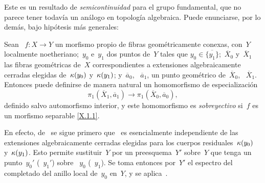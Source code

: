 Este es un resultado de \emph{semicontinuidad} para el grupo fundamental, que
no parece tener todavía un análogo en topología algebraica. Puede enunciarse,
por lo demás, bajo hipótesis más generales:

\begin{corollaire}
\label{X.2.4}
Sean
~$f\colon X\to Y$ un morfismo propio de fibras geométricamente conexas,
con~$Y$ localmente noetheriano;~$y_0$ e~$y_1$ dos puntos de~$Y$ tales que
$y_0\in\overline{\{y_1\}}$;~$\overline X_0$ y~$\overline X_1$ las fibras
geométricas de~$X$ correspondientes a extensiones algebraicamente cerradas
elegidas de~$\kappa(y_0)$ y~$\kappa(y_1)$; y~$\overline a_0$,
\resp~$\overline a_1$, un punto geométrico de~$\overline X_0$,
\resp~$\overline X_1$. Entonces puede definirse de manera natural un
homomorfismo de especialización
$$
\pi_1(\overline X_1,\overline a_1)\to
\pi_1(\overline X_0,\overline a_0),
$$
definido salvo automorfismo interior, y este homomorfismo es \emph{sobreyectivo}
si~$f$ es un morfismo separable \eqref{X.1.1}.
\end{corollaire}

En efecto, de~ se sigue primero que~ es esencialmente
independiente de las extensiones algebraicamente cerradas elegidas para los
cuerpos residuales~$\kappa(y_0)$ y~$\kappa(y_1)$. Esto permite sustituir~$Y$ por
un preesquema~$Y'$ sobre~$Y$ que tenga un punto~$y_0'$ (\resp~$y_1'$) sobre
~$y_0$ (\resp~$y_1$). Se toma entonces por~$Y'$ el espectro del completado del
anillo local de~$y_0$ en~$Y$, y se aplica~.


